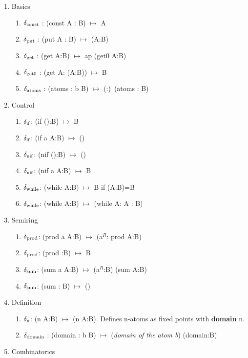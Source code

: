 \documentclass[11pt]{article}
\begin{document}
\begin{enumerate}
\item {Basics
\begin{enumerate}
\item{$\delta_{\rm const}$ : (const A : B) $\mapsto$ A}
\item{$\delta_{\rm put}$ : (put A : B) $\mapsto$ (A:B)}
\item{$\delta_{\rm get}$ : (get A:B) $\mapsto$ ap (get0 A:B)}  
\item{$\delta_{\rm get0}$ : (get A: (A:B)) $\mapsto$ B}
\item{$\delta_{\rm atoms}$ : (atoms : b B) $\mapsto$ (:)\ (atoms : B)}
\end{enumerate}
}
\item {Control
\begin{enumerate}
\item{$\delta_{\rm if}$: (if ():B) $\mapsto$ B }
\item{$\delta_{\rm if}$: (if a A:B) $\mapsto$ () }
\item{$\delta_{\rm nif}$: (nif ():B) $\mapsto$ () }
\item{$\delta_{\rm nif}$: (nif a A:B) $\mapsto$ B }
\item{$\delta_{\rm while}$: (while A:B) $\mapsto$ B if (A:B)=B }
\item{$\delta_{\rm while}$: (while A:B) $\mapsto$ (while A: A : B) }
\end{enumerate}
}
\item{Semiring
\begin{enumerate}
\item{$\delta_{\rm prod}$: (prod a A:B) $\mapsto$ (a$^R$: prod A:B)}
\item{$\delta_{\rm prod}$: (prod :B) $\mapsto$ B}
\item{$\delta_{\rm sum}$: (sum a A:B) $\mapsto$ (a$^R$:B) (sum A:B)}
\item{$\delta_{\rm sum}$: (sum : B) $\mapsto$ () }
\end{enumerate}
}
\item{Definition}
\begin{enumerate}
\item{$\delta_{\rm n}$: (n A:B) $\mapsto$ (n A:B).  Defines n-atoms as fixed points with {\bf domain} n.} 
\item{$\delta_{\rm domain}$ : (domain : b B) $\mapsto$ ({\it domain of the atom b}) (domain:B)}
\end{enumerate}
\item{Combinatorics} 
\begin{enumerate}

\end{enumerate}
\end{enumerate}
\end{document}
